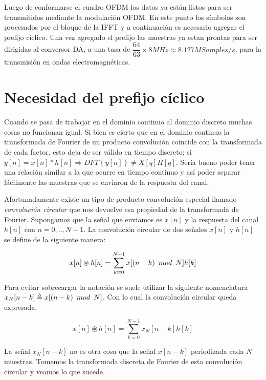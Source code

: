 Luego de conformarse el cuadro OFDM los datos ya están listos para ser transmitidos mediante la modulación OFDM. En este punto los símbolos son procesados por el bloque de la IFFT y a continuación es necesario agregar el prefijo cíclico. Una vez agregado el prefijo las muestras ya estan prontas para ser dirigidas al conversor \gls{DA}, a una tasa de $\dfrac{64}{63} \times 8MHz \approx 8.127 MSamples/s$, para la transmisión en ondas electromagnéticas.

\section{Necesidad del prefijo cíclico}

Cuando se pasa de trabajar en el dominio continuo al dominio discreto muchas cosas no funcionan igual. Si bien es cierto que en el dominio continuo la transformada de Fourier de un producto convolución coincide con la transformada de cada factor, esto deja de ser válido en tiempo discreto; si $y[n] = x[n]\ast h[n] \Rightarrow DFT \left\{ y[n] \right\} \neq X[q]H[q]$.
Sería bueno poder tener una relación similar a la que ocurre en tiempo continuo y así poder separar fácilmente las muestras que se enviaron de la respuesta del canal. 

Afortunadamente existe un tipo de producto convolución especial llamado \textit{convolución circular} que nos devuelve esa propiedad de la transformada de Fourier.
Supongamos que la señal que enviamos es $x[n]$ y la respuesta del canal $h[n]$ con $n = 0,..,N-1$. La convolución circular de dos señales $x[n]$ y $h[n]$ se define de la siguiente manera:

\begin{equation}
x[n] \circledast h[n] = \sum_{k = 0}^{N-1} x[(n-k) \enskip mod \enskip N]h[k]
\end{equation} 

Para evitar sobrecargar la notación se suele utilizar la siguiente nomenclatura $x_N[n-k] \triangleq x[(n-k) \enskip mod \enskip N]$. Con lo cual la convolución circular queda expresada:

\begin{equation}
x[n] \circledast h[n] = \sum_{k = 0}^{N-1} x_N[n-k] h[k]
\end{equation} 

La señal $x_N[n-k]$ no es otra cosa que la señal $x[n-k]$ periodizada cada $N$ muestras. Tomemos la transformada discreta de Fourier de esta convolución circular y veamos lo que sucede.


